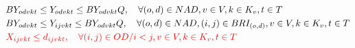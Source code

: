 \begin{align}
	 & BY_{odvkt} \leq Y_{odvkt} \leq BY_{odvkt} Q, \quad  \forall (o,d)\in NAD, v \in V, k \in K_v, t \in T                                                                                                       \label{eq: m1_activ_bin_autho}                                                 \\
	 & BY_{odvkt} \leq Y_{ijvkt} \leq BY_{odvkt} Q, \quad  \forall (o,d)\in NAD, (i,j) \in BRI_{(o,d)}, v \in V, k \in K_v, t \in T                                                                                \label{eq: m1_autho_igualar_trecho_maior}                                      \\
	 & \textcolor{red}{X_{ijvkt} \leq d_{ijvkt},  \quad \forall (i,j) \in OD / i < j  ,v \in V, k \in K_v, t\in T }                                                                                                 \label{eq: m1_assig_menor_dem}                                                 \\

\end{align}
